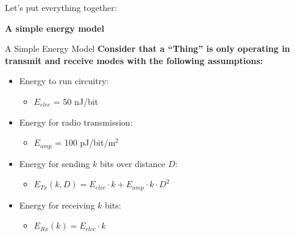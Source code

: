 \documentclass[aspectratio=169,11pt]{beamer}
\begin{document}
\begin{frame}{Let's put everything together:}
    \begin{center}
        \Large\textbf{A simple energy model}
    \end{center}
\end{frame}

\begin{frame}{A Simple Energy Model}
    \textbf{Consider that a ``Thing'' is only operating in transmit and receive modes with the following assumptions:}
    
    \vspace{0.3cm}
    \begin{itemize}
        \item Energy to run circuitry:
        \begin{itemize}
            \item $E_{elec}$ = 50 nJ/bit
        \end{itemize}
        \item Energy for radio transmission:
        \begin{itemize}
            \item $E_{amp}$ = 100 pJ/bit/m$^2$
        \end{itemize}
        \item Energy for sending $k$ bits over distance $D$:
        \begin{itemize}
            \item $E_{Tx}(k,D) = E_{elec} \cdot k + E_{amp} \cdot k \cdot D^2$
        \end{itemize}
        \item Energy for receiving $k$ bits:
        \begin{itemize}
            \item $E_{Rx}(k) = E_{elec} \cdot k$
        \end{itemize}
    \end{itemize}
\end{frame}
\end{document}
